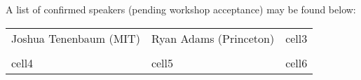 \documentclass{article}
\begin{document}







    A list of confirmed speakers (pending workshop acceptance) may be found below:

    \begin{center}
        \begin{tabular}{ l l l }
            Joshua Tenenbaum (MIT) & Ryan Adams (Princeton) & cell3 \\\\
            cell4 & cell5 & cell6 \\
        \end{tabular}
    \end{center}


\end{document}
